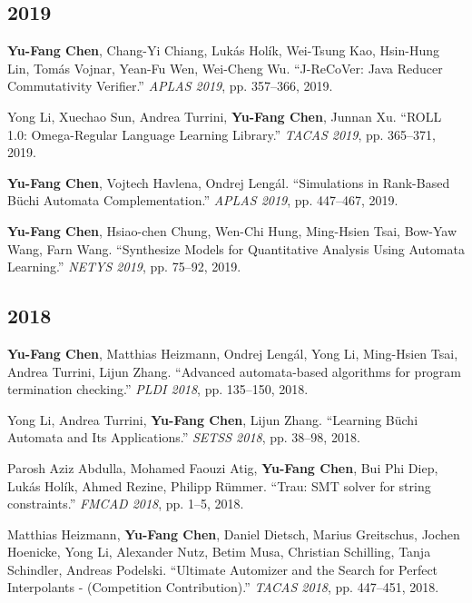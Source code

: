 \documentclass[10.5pt]{article}
\begin{document}
\subsection*{2019}
\begin{enumerate}[leftmargin=*,label={[\arabic*]},resume]
\item \textbf{Yu-Fang Chen}, Chang-Yi Chiang, Lukás Holík, Wei-Tsung Kao, Hsin-Hung Lin, Tomás Vojnar, Yean-Fu Wen, Wei-Cheng Wu. ``J-ReCoVer: Java Reducer Commutativity Verifier.'' \emph{APLAS 2019}, pp. 357--366, 2019.
\item Yong Li, Xuechao Sun, Andrea Turrini, \textbf{Yu-Fang Chen}, Junnan Xu. ``ROLL 1.0: Omega-Regular Language Learning Library.'' \emph{TACAS 2019}, pp. 365--371, 2019.
\item \textbf{Yu-Fang Chen}, Vojtech Havlena, Ondrej Lengál. ``Simulations in Rank-Based Büchi Automata Complementation.'' \emph{APLAS 2019}, pp. 447--467, 2019.
\item \textbf{Yu-Fang Chen}, Hsiao-chen Chung, Wen-Chi Hung, Ming-Hsien Tsai, Bow-Yaw Wang, Farn Wang. ``Synthesize Models for Quantitative Analysis Using Automata Learning.'' \emph{NETYS 2019}, pp. 75--92, 2019.
\end{enumerate}
\subsection*{2018}
\begin{enumerate}[leftmargin=*,label={[\arabic*]},resume]
\item \textbf{Yu-Fang Chen}, Matthias Heizmann, Ondrej Lengál, Yong Li, Ming-Hsien Tsai, Andrea Turrini, Lijun Zhang. ``Advanced automata-based algorithms for program termination checking.'' \emph{PLDI 2018}, pp. 135--150, 2018.
\item Yong Li, Andrea Turrini, \textbf{Yu-Fang Chen}, Lijun Zhang. ``Learning Büchi Automata and Its Applications.'' \emph{SETSS 2018}, pp. 38--98, 2018.
\item Parosh Aziz Abdulla, Mohamed Faouzi Atig, \textbf{Yu-Fang Chen}, Bui Phi Diep, Lukás Holík, Ahmed Rezine, Philipp Rümmer. ``Trau: SMT solver for string constraints.'' \emph{FMCAD 2018}, pp. 1--5, 2018.
\item Matthias Heizmann, \textbf{Yu-Fang Chen}, Daniel Dietsch, Marius Greitschus, Jochen Hoenicke, Yong Li, Alexander Nutz, Betim Musa, Christian Schilling, Tanja Schindler, Andreas Podelski. ``Ultimate Automizer and the Search for Perfect Interpolants - (Competition Contribution).'' \emph{TACAS 2018}, pp. 447--451, 2018.
\end{enumerate}
\end{document}
